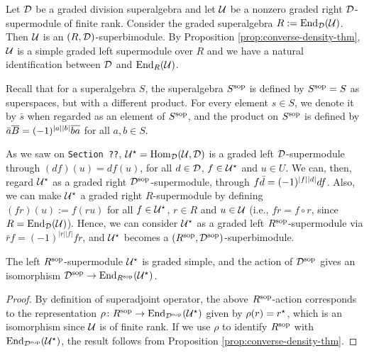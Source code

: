Let $\mathcal{D}$ be a graded division superalgebra and let $\mathcal U$ be a nonzero graded right $\mathcal{D}$-supermodule of finite rank. 
Consider the graded superalgebra $R := \operatorname{End}_{\mathcal{D}}(\mathcal U)$. 
Then $\mathcal U$ is an $(R, \mathcal{D})$-superbimodule. 
By Proposition \ref{prop:converse-density-thm}, $\mathcal U$ is a simple graded left supermodule over $R$ and we have a natural identification between $\mathcal{D}$ and $\operatorname{End}_R(\mathcal U)$.

Recall that for a superalgebra $S$, the superalgebra $S^{\mathrm{sop}}$ is defined by $S^{\mathrm{sop}} = S$ as superspaces, but with a different product. For every element $s\in S$, we denote it by $\bar s$ when regarded as an element of $S^{\mathrm{sop}}$, and the product on $S^{\mathrm{sop}}$ is defined by $\bar a \overline {B} = (-1)^{|a||b|} \overline{ba}$ for all $a, b \in S$.

As we saw on {\tt Section ??}, $\mathcal U^\star = \operatorname{Hom}_{\mathcal{D}} (\mathcal U, \mathcal{D})$ is a graded left $\mathcal{D}$-supermodule through $(df)(u) = df(u)$, for all $d\in \mathcal{D}$, $f\in \mathcal U^\star$ and $u\in U$. 
We can, then, regard $\mathcal U^\star$ as a graded right $\mathcal{D}^{\mathrm{sop}}$-supermodule, through $f \bar d = (-1)^{|f||d|} df$. 
Also, we can make $\mathcal U^\star$ a graded right $R$-supermodule by defining $(f r) (u) := f(r u)$ for all $f\in \mathcal U^\star$, $r\in R$ and $u\in \mathcal U$ (i.e., $f r = f \circ r$, since $R = \operatorname{End}_{\mathcal{D}}(\mathcal U)$). 
Hence, we can consider $\mathcal U^\star$ as a graded left $R^{\mathrm{sop}}$-supermodule via $\bar r f = (-1)^{|r||f|} f r$, %
and $\mathcal U^\star$ becomes a $(R^{\mathrm{sop}}, \mathcal{D}^{\mathrm{sop}})$-superbimodule.

\begin{lemma}\label{lemma:U-star-R-sop}
    The left $R^{\mathrm{sop}}$-supermodule $\mathcal U^\star$ is graded simple, and the action of $\mathcal{D}^{\mathrm{sop}}$ gives an isomorphism $\mathcal{D}^{\mathrm{sop}} \to \operatorname{End}_{R^{\mathrm{sop}}}(\mathcal U^\star)$.
\end{lemma}

\begin{proof}
    By definition of superadjoint operator, the above $R^{\mathrm{sop}}$-action corresponds to the representation $\rho\colon R^{\mathrm{sop}} \to \operatorname{End}_{\mathcal{D}^{\mathrm{sop}}} (\mathcal U^\star)$ given by $ \rho(r) = r^\star$, which is an isomorphism since $\mathcal U$ is of finite rank. 
    If we use $\rho$ to identify $R^{\mathrm{sop}}$ with $\operatorname{End}_{\mathcal{D}^{\mathrm{sop}}} (\mathcal U^\star)$, the result follows from Proposition \ref{prop:converse-density-thm}.
\end{proof}

